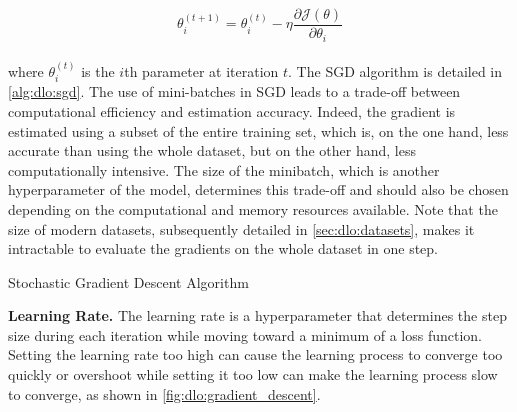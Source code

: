 \begin{equation}
\label{eqn:dlo:sgd_update}
\theta_i^{(t+1)} = \theta_i^{(t)} - \eta \frac{\partial \mathcal{J}(\theta)}{\partial \theta_i}
\end{equation}\\

\noindent where $\theta_i^{(t)}$ is the $i$th parameter at iteration $t$. The
\ac{SGD} algorithm is detailed in \cref{alg:dlo:sgd}. The use of mini-batches in
\ac{SGD} leads to a trade-off between computational efficiency and estimation
accuracy. Indeed, the gradient is estimated using a subset of the entire
training set, which is, on the one hand, less accurate than using the whole
dataset, but on the other hand, less computationally intensive. The size of the
minibatch, which is another hyperparameter of the model, determines this
trade-off and should also be chosen depending on the computational and memory
resources available. Note that the size of modern datasets, subsequently
detailed in \cref{sec:dlo:datasets}, makes it intractable to evaluate the
gradients on the whole dataset in one step.\\

\begin{algorithm}
  \caption{Stochastic Gradient Descent Algorithm}
  \label{alg:dlo:sgd}
  \begin{algorithmic}
    \ENDWHILE
  \end{algorithmic}
\end{algorithm}


\noindent \textbf{Learning Rate.} The learning rate is a hyperparameter that
determines the step size during each iteration while moving toward a minimum of
a loss function. Setting the learning rate too high can cause the learning
process to converge too quickly or overshoot while setting it too low can make
the learning process slow to converge, as shown in
\cref{fig:dlo:gradient_descent}.\\


